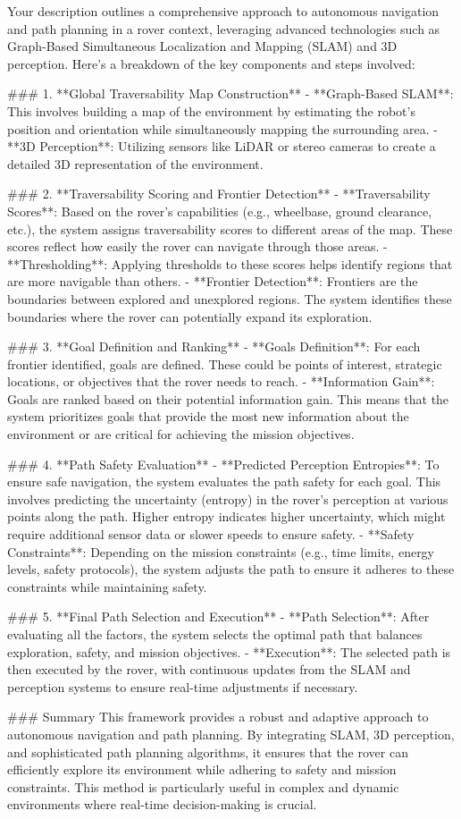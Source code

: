 Your description outlines a comprehensive approach to autonomous navigation and path planning in a rover context, leveraging advanced technologies such as Graph-Based Simultaneous Localization and Mapping (SLAM) and 3D perception. Here’s a breakdown of the key components and steps involved:

### 1. **Global Traversability Map Construction**
   - **Graph-Based SLAM**: This involves building a map of the environment by estimating the robot's position and orientation while simultaneously mapping the surrounding area.
   - **3D Perception**: Utilizing sensors like LiDAR or stereo cameras to create a detailed 3D representation of the environment.

### 2. **Traversability Scoring and Frontier Detection**
   - **Traversability Scores**: Based on the rover's capabilities (e.g., wheelbase, ground clearance, etc.), the system assigns traversability scores to different areas of the map. These scores reflect how easily the rover can navigate through those areas.
   - **Thresholding**: Applying thresholds to these scores helps identify regions that are more navigable than others.
   - **Frontier Detection**: Frontiers are the boundaries between explored and unexplored regions. The system identifies these boundaries where the rover can potentially expand its exploration.

### 3. **Goal Definition and Ranking**
   - **Goals Definition**: For each frontier identified, goals are defined. These could be points of interest, strategic locations, or objectives that the rover needs to reach.
   - **Information Gain**: Goals are ranked based on their potential information gain. This means that the system prioritizes goals that provide the most new information about the environment or are critical for achieving the mission objectives.

### 4. **Path Safety Evaluation**
   - **Predicted Perception Entropies**: To ensure safe navigation, the system evaluates the path safety for each goal. This involves predicting the uncertainty (entropy) in the rover's perception at various points along the path. Higher entropy indicates higher uncertainty, which might require additional sensor data or slower speeds to ensure safety.
   - **Safety Constraints**: Depending on the mission constraints (e.g., time limits, energy levels, safety protocols), the system adjusts the path to ensure it adheres to these constraints while maintaining safety.

### 5. **Final Path Selection and Execution**
   - **Path Selection**: After evaluating all the factors, the system selects the optimal path that balances exploration, safety, and mission objectives.
   - **Execution**: The selected path is then executed by the rover, with continuous updates from the SLAM and perception systems to ensure real-time adjustments if necessary.

### Summary
This framework provides a robust and adaptive approach to autonomous navigation and path planning. By integrating SLAM, 3D perception, and sophisticated path planning algorithms, it ensures that the rover can efficiently explore its environment while adhering to safety and mission constraints. This method is particularly useful in complex and dynamic environments where real-time decision-making is crucial.